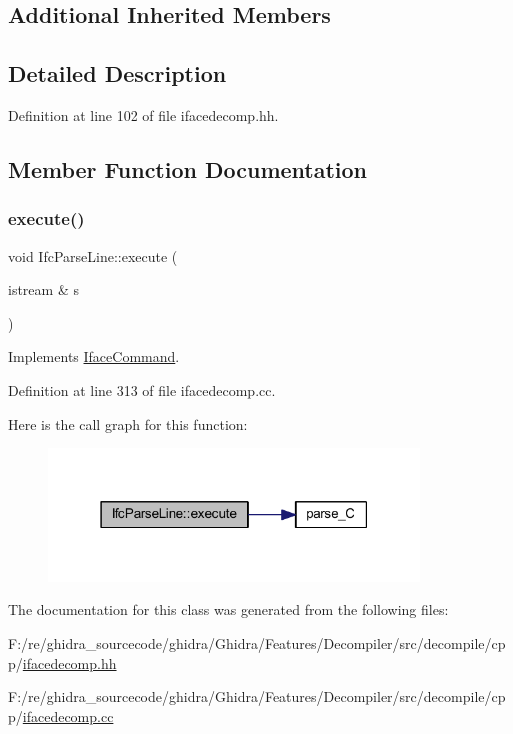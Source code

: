 \subsection*{Additional Inherited Members}


\subsection{Detailed Description}


Definition at line 102 of file ifacedecomp.\+hh.



\subsection{Member Function Documentation}
\mbox{\label{class_ifc_parse_line_ad1c74b89106a1f71511e80766f389de7}} 
\subsubsection{\texorpdfstring{execute()}{execute()}}
{\footnotesize\ttfamily void Ifc\+Parse\+Line\+::execute (\begin{DoxyParamCaption}\item[{istream \&}]{s }\end{DoxyParamCaption})\hspace{0.3cm}{\ttfamily [virtual]}}



Implements \mbox{\hyperlink{class_iface_command_af10e29cee2c8e419de6efe9e680ad201}{Iface\+Command}}.



Definition at line 313 of file ifacedecomp.\+cc.

Here is the call graph for this function\+:
\nopagebreak
\begin{figure}[H]
\begin{center}
\leavevmode
\includegraphics[width=279pt]{class_ifc_parse_line_ad1c74b89106a1f71511e80766f389de7_cgraph}
\end{center}
\end{figure}


The documentation for this class was generated from the following files\+:\begin{DoxyCompactItemize}
\item 
F\+:/re/ghidra\+\_\+sourcecode/ghidra/\+Ghidra/\+Features/\+Decompiler/src/decompile/cpp/\mbox{\hyperlink{ifacedecomp_8hh}{ifacedecomp.\+hh}}\item 
F\+:/re/ghidra\+\_\+sourcecode/ghidra/\+Ghidra/\+Features/\+Decompiler/src/decompile/cpp/\mbox{\hyperlink{ifacedecomp_8cc}{ifacedecomp.\+cc}}\end{DoxyCompactItemize}
